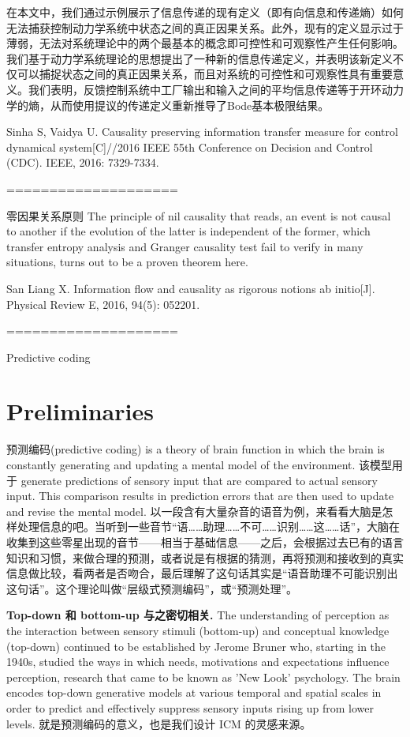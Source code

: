 \documentclass[letterpaper, onecolumn]{article}
\begin{document}
\begin{CJK*}{UTF8}{gbsn}
在本文中，我们通过示例展示了信息传递的现有定义（即有向信息和传递熵）如何无法捕获控制动力学系统中状态之间的真正因果关系。此外，现有的定义显示过于薄弱，无法对系统理论中的两个最基本的概念即可控性和可观察性产生任何影响。我们基于动力学系统理论的思想提出了一种新的信息传递定义，并表明该新定义不仅可以捕捉状态之间的真正因果关系，而且对系统的可控性和可观察性具有重要意义。我们表明，反馈控制系统中工厂输出和输入之间的平均信息传递等于开环动力学的熵，从而使用提议的传递定义重新推导了Bode基本极限结果。

Sinha S, Vaidya U. Causality preserving information transfer measure for control dynamical system[C]//2016 IEEE 55th Conference on Decision and Control (CDC). IEEE, 2016: 7329-7334. 

====================

零因果关系原则 The principle of nil causality that reads, an event is not causal to another if the evolution of the latter is independent of the former, which transfer entropy analysis and Granger causality test fail to verify in many situations, turns out to be a proven theorem here. 

San Liang X. Information flow and causality as rigorous notions ab initio[J]. Physical Review E, 2016, 94(5): 052201.

====================

Predictive coding

\section{Preliminaries}

预测编码(predictive coding) is a theory of brain function in which the brain is constantly generating and updating a mental model of the environment. 该模型用于 generate predictions of sensory input that are compared to actual sensory input. This comparison results in prediction errors that are then used to update and revise the mental model. 以一段含有大量杂音的语音为例，来看看大脑是怎样处理信息的吧。当听到一些音节“语……助理……不可……识别……这……话”，大脑在收集到这些零星出现的音节——相当于基础信息——之后，会根据过去已有的语言知识和习惯，来做合理的预测，或者说是有根据的猜测，再将预测和接收到的真实信息做比较，看两者是否吻合，最后理解了这句话其实是“语音助理不可能识别出这句话”。这个理论叫做“层级式预测编码”，或“预测处理”。

\textbf{Top-down 和 bottom-up 与之密切相关. }
The understanding of perception as the interaction between sensory stimuli (bottom-up) and conceptual knowledge (top-down) continued to be established by Jerome Bruner who, starting in the 1940s, studied the ways in which needs, motivations and expectations influence perception, research that came to be known as 'New Look' psychology.  The brain encodes top-down generative models at various temporal and spatial scales in order to predict and effectively suppress sensory inputs rising up from lower levels. 就是预测编码的意义，也是我们设计 ICM 的灵感来源。


\end{CJK*}
\end{document}
